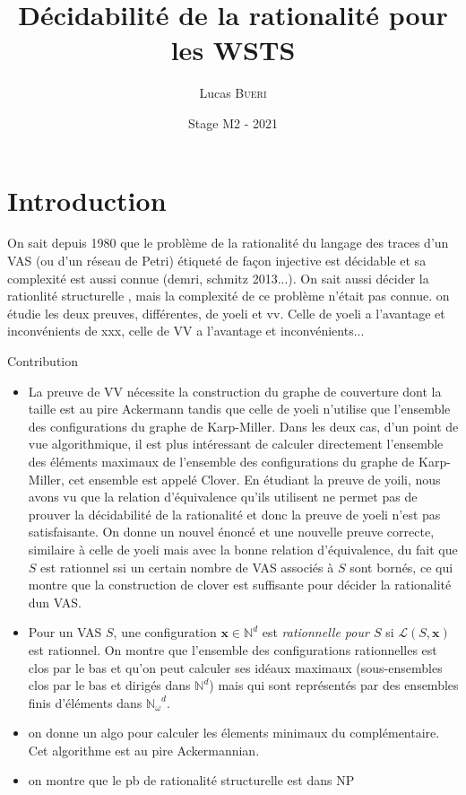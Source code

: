 \documentclass[a4paper,final]{article}
\title{Décidabilité de la rationalité pour les WSTS}
\author{Lucas \textsc{Bueri}}
\date{Stage M2 - 2021}
\theoremstyle{definition}
\newcommand{\N}{\ensuremath{\mathbb{N}}}
\newcommand{\Nomega}{\ensuremath{\mathbb{N}_\omega}}
\newcommand{\lang}{\ensuremath{\mathcal{L}}}
\newcommand{\vect}[1]{\ensuremath{\mathbf{#1}}}
\begin{document}
\maketitle


\section{Introduction}

On sait depuis 1980 que le problème de la rationalité du langage des traces d'un VAS (ou d'un réseau de Petri) étiqueté de façon injective est décidable \cite{giyo80,vavn81} et sa complexité est aussi connue (demri, schmitz 2013...). On sait aussi décider la rationlité structurelle \cite{vavn81}, mais la complexité de ce problème n'était pas connue. on étudie les deux preuves, différentes, de yoeli et vv. Celle de yoeli a l'avantage et inconvénients de xxx, celle de VV a l'avantage et inconvénients...


Contribution
\begin{itemize}
    \item La preuve de VV nécessite la construction du graphe de couverture dont la taille est au pire Ackermann tandis que celle de yoeli n'utilise que l'ensemble des configurations du graphe de Karp-Miller. Dans les deux cas, d'un point de vue algorithmique, il est plus intéressant de calculer directement l'ensemble des éléments maximaux de l'ensemble des configurations du graphe de Karp-Miller, cet ensemble est appelé Clover. En étudiant la preuve de yoili, nous avons vu que la relation d'équivalence qu'ils utilisent ne permet pas de prouver la décidabilité de la rationalité et donc la preuve de yoeli n'est pas satisfaisante. On donne un nouvel énoncé et une nouvelle preuve correcte, similaire à celle de yoeli mais avec la bonne relation d'équivalence, du fait que $S$ est rationnel ssi un certain nombre de VAS associés à $S$ sont bornés, ce qui montre que la construction de clover est suffisante pour décider la rationalité dun VAS.
    \item Pour un VAS $S$, une configuration $\vect{x} \in \N^d$ est \emph{rationnelle pour $S$} si $\lang(S,\vect{x})$ est rationnel. On montre que l'ensemble des configurations rationnelles est clos par le bas et qu'on peut calculer ses idéaux maximaux (sous-ensembles clos par le bas et dirigés dans $\N^d$) mais qui sont représentés par des ensembles finis d'éléments dans $\Nomega^d$.
    \item on donne un algo pour calculer les élements minimaux du complémentaire. Cet algorithme est au pire Ackermannian.
    \item on montre que le pb de rationalité structurelle est dans NP

\end{itemize}
\end{document}

